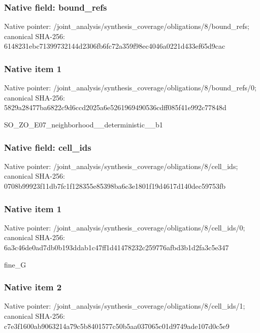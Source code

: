 \documentclass[10pt,a4paper]{article}
\begin{document}
\subsubsection{Native field: bound\_\allowbreak{}refs}
Native pointer: /joint\_\allowbreak{}analysis/synthesis\_\allowbreak{}coverage/obligations/8/bound\_\allowbreak{}refs; canonical SHA-256: 6148231ebc71399732144d2306fb6fc72a359f98ec4046a0221d433ef65d9cac

\subsubsection{Native item 1}
Native pointer: /joint\_\allowbreak{}analysis/synthesis\_\allowbreak{}coverage/obligations/8/bound\_\allowbreak{}refs/0; canonical SHA-256: 5829a28477ba6822c9d6ccd2025a6e5261969490536cdff085f41e992c77848d

\begingroup\raggedright\sloppy SO\_\allowbreak{}ZO\_\allowbreak{}E07\_\allowbreak{}neighborhood\_\allowbreak{}\_\allowbreak{}deterministic\_\allowbreak{}\_\allowbreak{}b1\par\endgroup

\subsubsection{Native field: cell\_\allowbreak{}ids}
Native pointer: /joint\_\allowbreak{}analysis/synthesis\_\allowbreak{}coverage/obligations/8/cell\_\allowbreak{}ids; canonical SHA-256: 0708b99923f11db7fc1f128355e85398ba6c3e1801f19d4617d140dec59753fb

\subsubsection{Native item 1}
Native pointer: /joint\_\allowbreak{}analysis/synthesis\_\allowbreak{}coverage/obligations/8/cell\_\allowbreak{}ids/0; canonical SHA-256: 6a3c46de0ad7db0b193ddab1c47ff1d41478232c259776afbd3b1d2fa3c5e347

\begingroup\raggedright\sloppy fine\_\allowbreak{}G\par\endgroup

\subsubsection{Native item 2}
Native pointer: /joint\_\allowbreak{}analysis/synthesis\_\allowbreak{}coverage/obligations/8/cell\_\allowbreak{}ids/1; canonical SHA-256: c7e3f1600ab9063214a79c5b8401577c50b5aa037065c01d9749ade107d0c5e9
\end{document}
